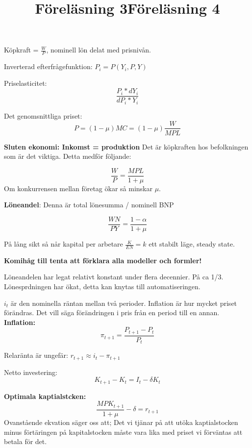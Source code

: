 \documentclass{article}
\begin{document}
\par
 
 \vspace{5mm}
 \title{Föreläsning 3}
 \vspace{5mm}
 
\par \noindent
Köpkraft = $\frac{W}{P}$, nominell lön delat med prisnivån.\par \noindent
Inverterad efterfrågefunktion: $P_i = P(Y_i,P,Y)$ \vspace{5mm} \par \noindent

Priselasticitet: $$\frac{P_i*dY_i}{dP_i*Y_i}$$

Det genomsnittliga priset: 
$$
P = (1-\mu)MC = (1-\mu)\frac{W}{MPL}
$$

\textbf{Sluten ekonomi: Inkomst = produktion}
Det är köpkraften hos befolkningen som är det viktiga. Detta medför följande: 

$$
 \frac{W}{P} = \frac{MPL}{1+\mu}
$$
Om konkurrensen mellan företag ökar så minskar $ \mu$. \par \noindent

\textbf{Löneandel}: Denna är total lönesumma / nominell BNP 

$$
\frac{WN}{PY} = \frac{1-\alpha}{1+\mu}
$$

På lång sikt så når kapital per arbetare $ \frac{K}{EN} = k $ ett stabilt läge, steady state. 

\textbf{Komihåg till tenta att förklara alla modeller och formler!}

Löneandelen har legat relativt konstant under flera decennier. På ca 1/3. 
Lönesprdningen har ökat, detta kan knytas till automatiseringen. 

\vspace{5mm}
\title{Föreläsning 4} \par \noindent
\vspace{5mm}

$i_t$ är den nominella räntan mellan två perioder. Inflation är hur mycket priset förändras. Det vill säga förändringen i pris från en period till en annan. 
\textbf{Inflation: }
$$
\pi_{t+1} = \frac{P_{t+1}-P_t}{P_t}
$$

Relaränta är ungefär: $r_{t+1} \approx i_t - \pi_{t+1}$

Netto investering: 
$$
K_{t+1} - K_t = I_t -\delta K_t 
$$

\textbf{Optimala kaptialstcken: }
$$
\frac{MPK_{t+1}}{1+\mu}-\delta = r_{t+1}
$$
Ovanstående ekvation säger oss att; Det vi tjänar på att utöka kaptialstocken minus förtäringen på kapitalstocken måste vara lika med priset vi förväntas att betala för det. 
\end{document}

